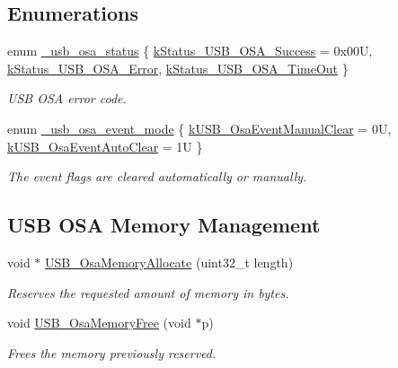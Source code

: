 \subsection*{Enumerations}
\begin{DoxyCompactItemize}
\item 
enum \hyperlink{group__usb__os__abstraction_ga453ebd2f93aafb8c938c3a23c815f9bd}{\-\_\-usb\-\_\-osa\-\_\-status} \{ \hyperlink{group__usb__os__abstraction_gga453ebd2f93aafb8c938c3a23c815f9bdab90805fb75297fda1ca60dbb2283f933}{k\-Status\-\_\-\-U\-S\-B\-\_\-\-O\-S\-A\-\_\-\-Success} = 0x00\-U, 
\hyperlink{group__usb__os__abstraction_gga453ebd2f93aafb8c938c3a23c815f9bda40b794ea06e27b8ec1d67538f12eb350}{k\-Status\-\_\-\-U\-S\-B\-\_\-\-O\-S\-A\-\_\-\-Error}, 
\hyperlink{group__usb__os__abstraction_gga453ebd2f93aafb8c938c3a23c815f9bda9ff36cb34c565283214974d1097d08df}{k\-Status\-\_\-\-U\-S\-B\-\_\-\-O\-S\-A\-\_\-\-Time\-Out}
 \}
\begin{DoxyCompactList}\small\item\em U\-S\-B O\-S\-A error code. \end{DoxyCompactList}\item 
enum \hyperlink{group__usb__os__abstraction_gaf3dc48c688f7c71cce122a1a0d4a12bd}{\-\_\-usb\-\_\-osa\-\_\-event\-\_\-mode} \{ \hyperlink{group__usb__os__abstraction_ggaf3dc48c688f7c71cce122a1a0d4a12bdac7c0be065c2f8e1f9c25758dd648fa24}{k\-U\-S\-B\-\_\-\-Osa\-Event\-Manual\-Clear} = 0\-U, 
\hyperlink{group__usb__os__abstraction_ggaf3dc48c688f7c71cce122a1a0d4a12bda817b3244c099598106ffa78a4faac361}{k\-U\-S\-B\-\_\-\-Osa\-Event\-Auto\-Clear} = 1\-U
 \}
\begin{DoxyCompactList}\small\item\em The event flags are cleared automatically or manually. \end{DoxyCompactList}\end{DoxyCompactItemize}
\subsection*{U\-S\-B O\-S\-A Memory Management}
\begin{DoxyCompactItemize}
\item 
void $\ast$ \hyperlink{group__usb__os__abstraction_gab17b3446bbcfb6207dc230fcdd4c9f99}{U\-S\-B\-\_\-\-Osa\-Memory\-Allocate} (uint32\-\_\-t length)
\begin{DoxyCompactList}\small\item\em Reserves the requested amount of memory in bytes. \end{DoxyCompactList}\item 
void \hyperlink{group__usb__os__abstraction_ga3d4a16dd11d39ce340299876f92d9366}{U\-S\-B\-\_\-\-Osa\-Memory\-Free} (void $\ast$p)
\begin{DoxyCompactList}\small\item\em Frees the memory previously reserved. \end{DoxyCompactList}\end{DoxyCompactItemize}
